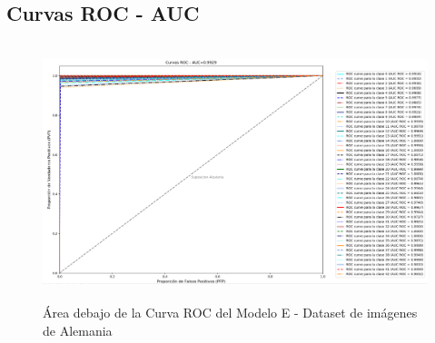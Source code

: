 		\subsection{Curvas ROC - AUC}  
					\begin{figure}[H]
						\includegraphics[width=\textwidth, height=7.5cm]{images/desarrollo/testResults/german/ROC_curve_modelE} 
						\begin{center}
						\caption{\small{Área debajo de la Curva ROC del Modelo E - Dataset de imágenes de Alemania}}
						{\small{\fontsize{10}{16.8}\selectfont {Fuente: Elaboración propia}}}
						\end{center}
						\vspace{-1.5em}
					\end{figure}
